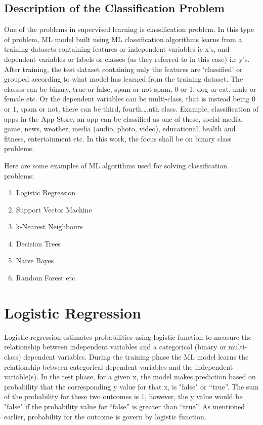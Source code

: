 \documentclass[conference]{IEEEtran}
\begin{document}
\subsection{Description of the Classification Problem}
One of the problems in supervised learning is classification problem. In this type of problem, ML model built using ML classification algorithms learns from a training datasets containing features or independent variables ie x’s, and dependent variables or labels or classes (as they referred to in this case) i.e y’s. After training, the test dataset containing only the features are ‘classified’ or grouped
according to what model has learned from the training dataset. The classes can be binary, true or false, spam or not spam, 0 or 1, dog or cat, male or female etc. Or the dependent variables can be multi-class, that is instead being 0 or 1, spam or not, there can be third, fourth….nth class. Example, classification of apps in the App Store, an app can be classified as one of these, social media, game, news, weather, media (audio, photo, video), educational, health and fitness, entertainment etc. In
this work, the focus shall be on binary class problems.

Here are some examples of ML algorithms used for solving classification problems:
\begin{enumerate}
\item Logistic Regression
\item Support Vector Machine
\item k-Nearest Neighbours
\item Decision Trees
\item Naive Bayes
\item Random Forest etc.
\end{enumerate}

\section{Logistic Regression}
Logistic regression estimates probabilities using logistic function to measure the relationship between independent variables and a categorical (binary or multi-class) dependent variables. During the training phase the ML model learns the relationship between categorical dependent variables and the independent variable(s). In the test phase, for a given x, the model makes prediction based on probability that the corresponding y value for that x, is "false" or “true”. The sum of the
probability for these two outcomes is 1, however, the y value would be "false" if the probability value for “false” is greater than “true”. As mentioned earlier, probability for the outcome is govern by logistic function.
\end{document}
